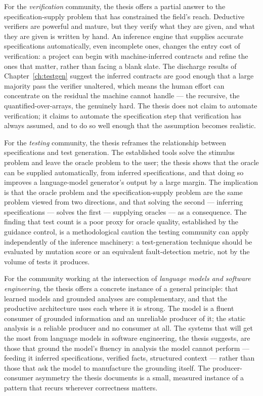 For the \emph{verification} community, the thesis offers a partial answer to the
specification-supply problem that has constrained the field's reach. Deductive
verifiers are powerful and mature, but they verify what they are given, and what
they are given is written by hand. An inference engine that supplies accurate
specifications automatically, even incomplete ones, changes the entry cost of
verification: a project can begin with machine-inferred contracts and refine the
ones that matter, rather than facing a blank slate. The discharge results of
Chapter~\ref{ch:testgen} suggest the inferred contracts are good enough that a
large majority pass the verifier unaltered, which means the human effort can
concentrate on the residual the machine cannot handle --- the recursive,
the quantified-over-arrays, the genuinely hard. The thesis does not claim to
automate verification; it claims to automate the specification step that
verification has always assumed, and to do so well enough that the assumption
becomes realistic.

For the \emph{testing} community, the thesis reframes the relationship between
specifications and test generation. The established tools solve the stimulus
problem and leave the oracle problem to the user; the thesis shows that the oracle
can be supplied automatically, from inferred specifications, and that doing so
improves a language-model generator's output by a large margin. The implication is
that the oracle problem and the specification-supply problem are the same problem
viewed from two directions, and that solving the second --- inferring
specifications --- solves the first --- supplying oracles --- as a consequence.
The finding that test count is a poor proxy for oracle quality, established by the
guidance control, is a methodological caution the testing community can apply
independently of the inference machinery: a test-generation technique should be
evaluated by mutation score or an equivalent fault-detection metric, not by the
volume of tests it produces.

For the community working at the intersection of \emph{language models and
software engineering}, the thesis offers a concrete instance of a general
principle: that learned models and grounded analyses are complementary, and that
the productive architecture uses each where it is strong. The model is a fluent
consumer of grounded information and an unreliable producer of it; the static
analysis is a reliable producer and no consumer at all. The systems that will get
the most from language models in software engineering, the thesis suggests, are
those that ground the model's fluency in analysis the model cannot perform ---
feeding it inferred specifications, verified facts, structured context --- rather
than those that ask the model to manufacture the grounding itself. The
producer-consumer asymmetry the thesis documents is a small, measured instance of
a pattern that recurs wherever correctness matters.

